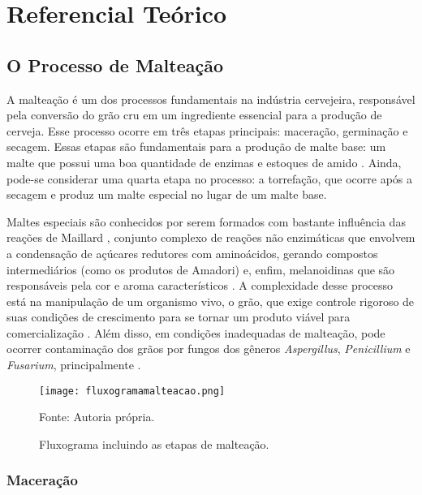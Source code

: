 \chapter[Referencial Teórico]{Referencial Teórico}

\section{O Processo de Malteação}

A malteação é um dos processos fundamentais na indústria cervejeira, responsável pela conversão do grão cru em um ingrediente essencial para a produção de cerveja. Esse processo ocorre em três etapas principais: maceração, germinação e secagem. Essas etapas são fundamentais para a produção de malte base: um malte que possui uma boa quantidade de enzimas e estoques de amido \cite{BRIGGS2004,CENCI2021}. Ainda, pode-se considerar uma quarta etapa no processo: a torrefação, que ocorre após a secagem e produz um malte especial no lugar de um malte base. 

Maltes especiais são conhecidos por serem formados com bastante influência das reações de Maillard \cite{COGHE2004}, conjunto complexo de reações não enzimáticas que envolvem a condensação de açúcares redutores com aminoácidos, gerando compostos intermediários (como os produtos de Amadori) e, enfim, melanoidinas que são responsáveis pela cor e aroma característicos \cite{nursten2005maillard}. A complexidade desse processo está na manipulação de um organismo vivo, o grão, que exige controle rigoroso de suas condições de crescimento para se tornar um produto viável para comercialização \cite{MALLETT2022}. Além disso, em condições inadequadas de malteação, pode ocorrer contaminação dos grãos por fungos dos gêneros \textit{Aspergillus}, \textit{Penicillium} e \textit{Fusarium}, principalmente \cite{LUARASI2016}.

\begin{figure}[ht]
    \centering
    \caption{Fluxograma incluindo as etapas de malteação.}
    \label{fig:fluxogramamalteacao}
    \texttt{[image: fluxogramamalteacao.png]}

    {\centering\footnotesize Fonte: Autoria própria.\par}
\end{figure}

\subsection{Maceração}

